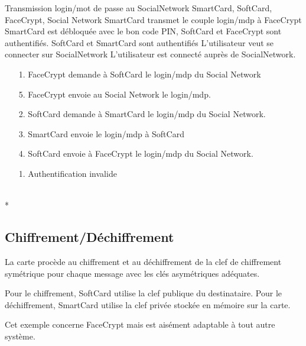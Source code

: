 \documentclass[a4paper,11pt,french]{article}
\begin{document}
\fiche
{Transmission login/mot de passe au SocialNetwork}
	{SmartCard, SoftCard, FaceCrypt, Social Network}
    {SmartCard transmet le couple login/mdp à FaceCrypt}
	{SmartCard est débloquée avec le bon code PIN, SoftCard et FaceCrypt sont 
    authentifiés. SoftCard et SmartCard sont authentifiés}
    {L'utilisateur veut se connecter sur SocialNetwork}
    {L'utilisateur est connecté auprès de SocialNetwork.}
    {\begin{itemize}
        \item[]
        \item[1.] FaceCrypt demande à SoftCard le login/mdp du Social Network
        \item[5.] FaceCrypt envoie au Social Network le login/mdp.
    \end{itemize}
    }
	{\begin{itemize}
        \item[]
		\item[2.] SoftCard demande à SmartCard le login/mdp du Social Network.
		\item[3.] SmartCard envoie le login/mdp à SoftCard
        \item[4.] SoftCard envoie à FaceCrypt le login/mdp du Social Network.
	\end{itemize}
	}
	{}
\flots
    {}
    {\begin{itemize}
    \item[]
    \item[1.] Authentification invalide
    \end{itemize}
    }
	{}    
\\*

\subsection{Chiffrement/Déchiffrement}
La carte procède au chiffrement et au déchiffrement de la clef de chiffrement 
symétrique pour chaque message avec les clés asymétriques adéquates.

Pour le chiffrement, SoftCard utilise la clef publique du destinataire. 
Pour le déchiffrement, SmartCard utilise la clef privée stockée en mémoire sur
la carte.

Cet exemple concerne FaceCrypt mais est aisément adaptable à tout autre système.
\end{document}
